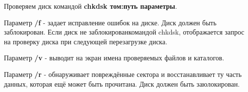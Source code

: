 

Проверяем диск командой \textbf{chkdsk том:путь параметры}.

Параметр \textbf{/f} - задает исправление ошибок на диске. Диск должен быть заблокирован. Если диск не заблокированкомандой chkdsk, отображается запрос на проверку диска при следующей перезагрузке диска.

Параметр \textbf{/v} - выводит на экран имена проверяемых файлов и каталогов.

Параметр \textbf{/r} - обнаруживает повреждённые сектора и восстанавливает ту часть данных, которая ещё может быть прочитана. Диск должен быть заюлокирован.

